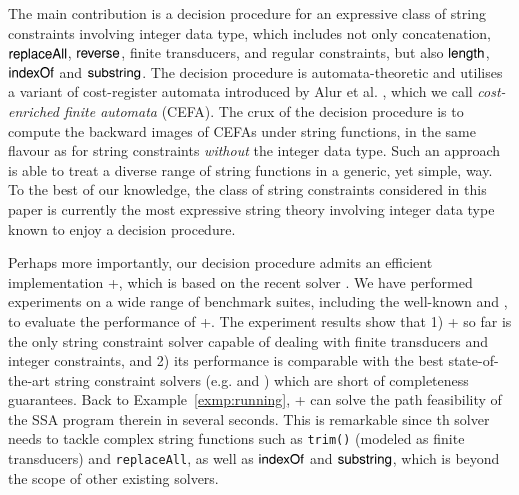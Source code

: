 The main contribution is a decision procedure for an expressive class of string constraints involving  integer data type, which includes not only concatenation, $\mathsf{replaceAll}$, $\mathsf{reverse}$, finite transducers, and regular constraints, but also $\mathsf{length}$, $\mathsf{indexOf}$ and $\mathsf{substring}$. The decision procedure is automata-theoretic and utilises a variant of cost-register automata introduced by Alur et al. \cite{RLJ+13}, which we call \emph{cost-enriched finite automata} (CEFA). The crux of the decision procedure is to compute the backward images of CEFAs under string functions,  in the same flavour as \cite{CHL+19} for string constraints \emph{without} the integer data type. Such an approach %
is able to treat %
a diverse range of string functions in a generic, yet simple, way. To the best of our knowledge, the class of string constraints considered in this paper is currently the most expressive string theory involving integer data type known to enjoy a decision procedure. 

Perhaps more importantly, our decision procedure admits an efficient implementation {\ostrich}+, which is based on %
the recent {\ostrich} solver \cite{CHL+19}.  We have performed experiments on a wide range of benchmark suites, including the well-known {\kaluzabench} and {\pyexbench}, to evaluate the performance of {\ostrich}+. The experiment results show that  %
1) {\ostrich}+ so far is the only string constraint solver capable of dealing with finite transducers and integer constraints, and 2) its performance is comparable with the best state-of-the-art string constraint solvers (e.g. {\cvc} and {\zthreetrau}) which are short of completeness guarantees. Back to Example~\ref{exmp:running}, {\ostrich}+ can solve  the path feasibility of the SSA program therein in   several seconds. This is remarkable since %
th solver needs to tackle complex string functions such as {\tt trim()} (modeled as finite transducers) and {\tt replaceAll}, %
as well as %
$\mathsf{indexOf}$  and $\mathsf{substring}$, which is beyond the scope of other existing solvers. 




